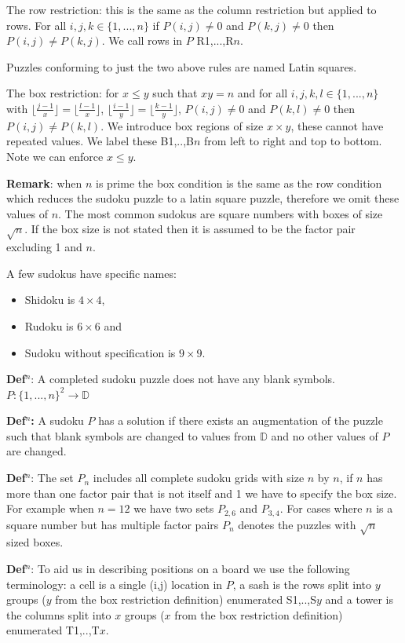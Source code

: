 \documentclass[a4paper,11pt]{report}
\newcounter{row}
\newcounter{col}
\begin{document}
The row restriction: this is the same as the column restriction but applied to rows. For all $i,j,k\in \{1,...,n\}$ if $P(i,j)\neq0$ and $P(k,j)\neq0$ then $P(i,j)\neq P(k,j)$. We call rows in $P$ R1,...,R$n$.

Puzzles conforming to just the two above rules are named Latin squares. 

The box restriction: for $x\leq y$ such that $xy=n$ and for all $i,j,k,l\in\{1,...,n\}$ with $\lfloor \frac{j-1}{x} \rfloor=\lfloor \frac{l-1}{x}\rfloor$, $\lfloor \frac{i-1}{y} \rfloor=\lfloor \frac{k-1}{y}\rfloor$, $P(i,j)\neq0$ and $P(k,l)\neq0$ then $P(i,j)\neq P(k,l)$. We introduce box regions of size $x\times y$, these cannot have repeated values. We label these B1,..,B$n$ from left to right and top to bottom. Note we can enforce $x\leq y$. 

\textbf{Remark}: when $n$ is prime the box condition is the same as the row condition which reduces the sudoku puzzle to a latin square puzzle, therefore we omit these values of $n$. The most common sudokus are square numbers with boxes of size $\sqrt{n}$. If the box size is not stated then it is assumed to be the factor pair excluding 1 and $n$.

A few sudokus have specific names:
\begin{itemize}
\item Shidoku is $4\times 4$,
\item Rudoku is $6\times 6$ and
\item Sudoku without specification is $9\times 9$.
\end{itemize} 

\textbf{Def$^n$}: A completed sudoku puzzle does not have any blank symbols. $P:  \{1,...,n\}^2\rightarrow\mathbb D$ 

\textbf{Def$^n$:} A sudoku $P$ has a solution if there exists an augmentation of the puzzle such that blank symbols are changed to values from $\mathbb D$ and no other values of $P$ are changed.

\textbf{Def$^n$}: The set $P_n$ includes all complete sudoku grids with size $n$ by $n$, if $n$ has more than one factor pair that is not itself and 1 we have to specify the box size. For example when $n=12$ we have two sets $P_{2,6}$ and $P_{3,4}$. For cases where $n$ is a square number but has multiple factor pairs $P_n$ denotes the puzzles with $\sqrt{n}$ sized boxes.

\textbf{Def$^n$}: To aid us in describing positions on a board we use the following terminology: a cell is a single (i,j) location in $P$, a sash is the rows split into $y$ groups ($y$ from the box restriction definition) enumerated S1,..,S$y$ and a tower is the columns split into $x$ groups  ($x$ from the box restriction definition) enumerated T1,..,T$x$.
\end{document}
